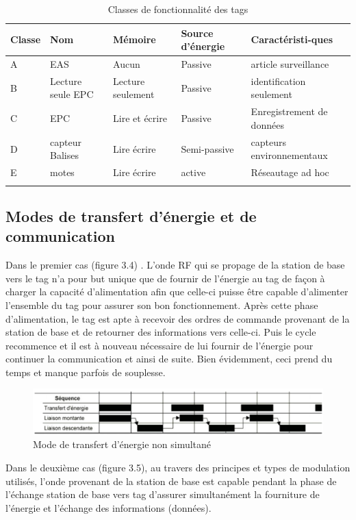 \documentclass[11pt, a4paper, twoside]{book}
\begin{document}
\begin{longtable}{|p{}|p{}|p{}| p{}|p{}|}
\hline
\textbf{Classe} & \textbf{Nom} & \textbf{Mémoire} & \textbf{Source d'énergie} & \textbf{Caractéristi-ques} \\
\hline
A & EAS & Aucun & Passive & article surveillance \\
\hline
B & Lecture seule EPC & Lecture seulement & Passive & identification seulement \\
\hline
C & EPC & Lire et écrire & Passive & Enregistrement de données \\
\hline
D & capteur Balises & Lire écrire & Semi-passive & capteurs environnementaux \\
\hline
E & motes & Lire écrire & active & Réseautage ad hoc \\
\hline
\caption{Classes de fonctionnalité des tags}
\end{longtable}

\subsection{Modes de transfert d’énergie et de communication}
Dans le premier cas (figure 3.4) . L’onde RF qui se propage de la station de base vers le tag n’a pour but unique que de fournir de l’énergie au tag de façon à charger la capacité d’alimentation afin que celle-ci puisse être capable d’alimenter l’ensemble du tag pour assurer son bon fonctionnement. Après cette phase d'alimentation, le tag est apte à recevoir des ordres de commande provenant de la station de base et de retourner des informations vers celle-ci. Puis le cycle recommence et il est à nouveau nécessaire de lui fournir de l'énergie pour continuer la communication et ainsi de suite. Bien évidemment, ceci prend du temps et manque parfois de souplesse.\\
\begin{figure}[H]
\centering
\includegraphics[width=\textwidth]{figa}
\caption{Mode de transfert d'énergie non simultané}
\end{figure}

Dans le deuxième cas (figure 3.5), au travers des principes et types de modulation utilisés, l'onde provenant de la station de base est capable pendant la phase de l'échange station de base vers tag d'assurer simultanément la fourniture de l'énergie et l'échange des informations (données).\\
\end{document}
